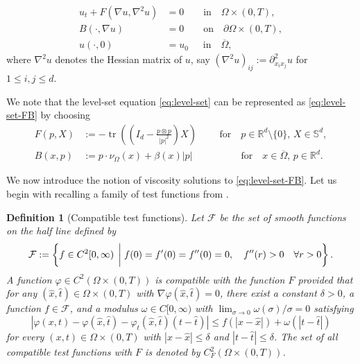 \documentclass[11pt]{article}
\numberwithin{equation}{section}
\newtheorem{defn}[theorem]{Definition}
\newcommand{\R}{\mathbb{R}}
\def\le{\leqslant}
\def\leq{\leqslant}
\begin{document}
\begin{equation}
\begin{aligned}
\label{eq:level-set-FB}
    u_t + F(\nabla u, \nabla^2 u) &= 0\qquad\mbox{in}\quad \Omega\times(0,T),\\
    B(\cdot, \nabla u) &= 0\qquad\mbox{on}\quad \partial\Omega\times (0,T),\\
    u(\cdot,0) &= u_0\,\,\,\quad\mbox{in}\quad\overline{\Omega},
    \end{aligned}
\end{equation}
where $\nabla^2 u$ denotes the Hessian matrix of $u$, say $(\nabla^2 u)_{ij} := \partial^2_{x_ix_j}u$ for $1\le i,j\le d$.

We note that the level-set equation \eqref{eq:level-set} can be represented as \eqref{eq:level-set-FB} by choosing
\begin{equation}
\label{eq:FB}
    \begin{aligned}
    F(p,X) &:= -\operatorname{tr}\left(\left(I_d - \frac{p\otimes p}{|p|^2}\right)X\right)\qquad\,\,\mbox{for}\quad p\in\R^d\setminus\{0\},\, X\in \mathbb S^d,\\
    B(x, p) &:= p \cdot \nu_\Omega(x) + \beta (x) |p|\qquad\quad\qquad\mbox{for}\quad x\in\overline{\Omega},\, p\in\R^d.
    \end{aligned}
\end{equation}

We now introduce the notion of viscosity solutions to \eqref{eq:level-set-FB}.
Let us begin with recalling a family of test functions from \cite[\S 2.1.3]{G06}.

\begin{defn}[Compatible test functions]
    Let $\mathcal F$ be the set of smooth functions on the half line defined by
    \[
    \mathcal F := \left\{f\in C^2[0,\infty)\,\biggm| f(0) = f'(0) = f''(0) = 0,\quad f''(r) > 0\quad\forall r > 0\right\}.
    \]
    A function $\varphi\in C^2({\Omega}\times(0,T))$ is compatible with the function $F$
    provided that for any $(\hat x, \hat t)\in\Omega\times(0,T)$ with $\nabla\varphi(\hat x, \hat t) = 0$,
    there exist a constant $\delta > 0$, a function $f \in \mathcal F$, and a modulus $\omega\in C[0,\infty)$ with $\lim_{\sigma\to 0}\omega(\sigma)/\sigma =0$
    satisfying
    \[
    |\varphi(x,t) - \varphi(\hat x, \hat t) - \varphi_t(\hat x, \hat t)(t - \hat t)| \leq f(|x- \hat x|) + \omega(|t - \hat t|)
    \]
    for every $(x,t) \in\Omega\times(0,T)$ with $|x-\hat x|\le \delta$ and $|t - \hat t|\le \delta$.
    The set of all compatible test functions with $F$ is denoted by $C^2_F(\Omega\times(0,T))$.
\end{defn}
\end{document}
